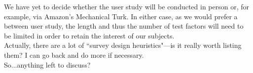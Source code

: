 \documentclass[12pt, twocolumn]{article}
\begin{document}
We have yet to decide whether the user study will be conducted in person or, for example, via Amazon's Mechanical Turk. In either case, as we would prefer a between user study, the length and thus the number of test factors will need to be limited in order to retain the interest of our subjects. \\
Actually, there are a lot of ``survey design heuristics"---is it really worth listing them? I can go back and do more if necessary.
\\

So...anything left to discuss?










\end{document}
